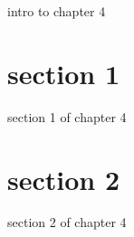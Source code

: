 intro to chapter 4
\section{section 1}
section 1 of chapter 4
\section{section 2}
section 2 of chapter 4